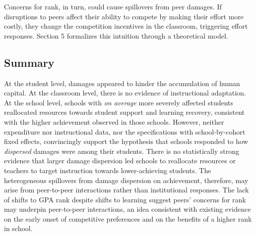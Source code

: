 Concerns for rank, in turn, could cause spillovers from peer damages. If disruptions to peers affect their ability to compete by making their effort more costly, they change the competition incentives in the classroom, triggering effort responses. Section 5 formalizes this intuition through a theoretical model.


\subsection{Summary}

At the student level, damages appeared to hinder the accumulation of human capital. At the classroom level, there is no evidence of instructional adaptation. At the school level, schools with {\itshape on average} more severely affected students reallocated resources towards student support and learning recovery, consistent with the higher achievement observed in those schools. However, neither expenditure nor instructional data, nor the specifications with school-by-cohort fixed effects, convincingly support the hypothesis that schools responded to how {\itshape dispersed} damages were among their students. There is no statistically strong evidence that larger damage dispersion led schools to reallocate resources or teachers to target instruction towards lower-achieving students. The heterogeneous spillovers from damage dispersion on achievement, therefore, may arise from peer-to-peer interactions rather than institutional responses. The lack of shifts to GPA rank despite shifts to learning suggest peers' concerns for rank may underpin peer-to-peer interactions, an idea consistent with existing evidence on the early onset of competitive preferences and on the benefits of a higher rank in school.\par 

